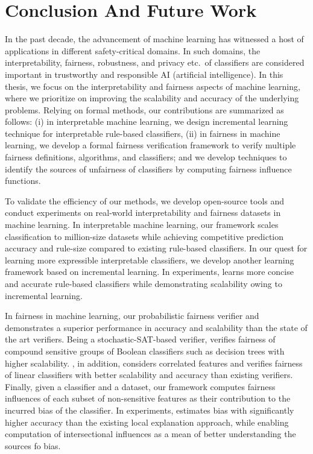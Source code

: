 \chapter{Conclusion And Future Work} In the past decade, the advancement of machine learning has witnessed a host of  applications in different safety-critical domains. In such domains, the interpretability, fairness, robustness, and privacy etc.\ of classifiers are considered important in trustworthy and responsible AI (artificial intelligence). In this thesis, we focus on the interpretability and fairness aspects of machine learning, where we prioritize on improving the scalability and accuracy of the underlying problems. Relying on formal methods, our contributions are summarized as follows: (i) in interpretable machine learning, we design incremental learning technique for interpretable rule-based classifiers, (ii) in fairness in machine learning, we develop a formal fairness verification framework to verify multiple fairness definitions, algorithms, and classifiers; and we develop techniques to identify the sources of unfairness of classifiers by computing fairness influence functions.


To validate the efficiency of our methods, we develop open-source tools and conduct experiments on real-world interpretability and fairness datasets in machine learning. In interpretable machine learning, our framework {\imli} scales classification to million-size datasets while achieving competitive prediction accuracy and rule-size compared to existing rule-based classifiers. In our quest for learning more expressible interpretable classifiers, we develop another learning framework {\crr} based on incremental learning. In experiments, {\crr} learns more concise and accurate rule-based classifiers while demonstrating scalability owing to incremental learning. 


In fairness in machine learning, our probabilistic fairness verifier {\justicia} and {\fvgm} demonstrates a superior performance in accuracy and scalability than the state of the art verifiers. Being a stochastic-SAT-based verifier, {\justicia} verifies fairness of compound sensitive groups of Boolean classifiers such as decision trees with higher scalability. {\fvgm}, in addition, considers correlated features and verifies fairness of linear classifiers with better scalability and accuracy than existing verifiers. Finally, given a classifier and a dataset, our framework {\fairXplainer} computes fairness influences of each subset of non-sensitive features as their contribution to the incurred bias of the classifier. In experiments, {\fairXplainer} estimates bias with significantly higher accuracy than the existing local explanation approach, while enabling computation of intersectional influences as a mean of better understanding the sources fo bias.

